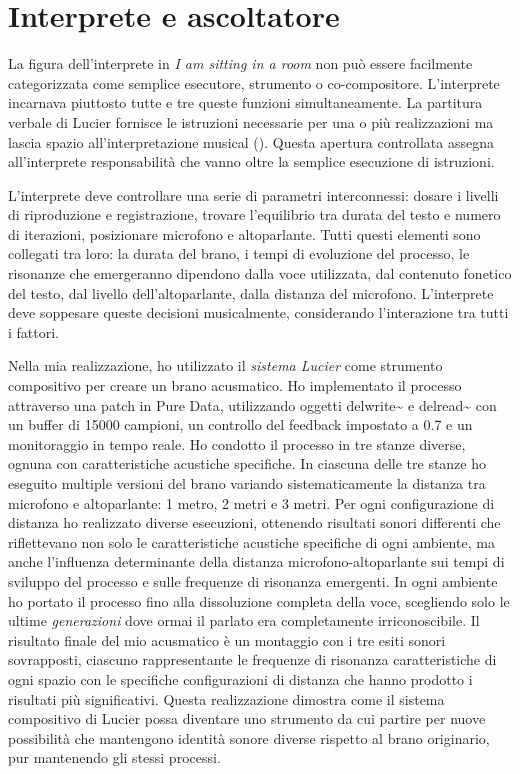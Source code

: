 
\section{Interprete e ascoltatore}
La figura dell'interprete in \textit{I am sitting in a room} non può essere facilmente categorizzata come semplice esecutore, strumento o co-compositore. L'interprete incarnava piuttosto tutte e tre queste funzioni simultaneamente. La partitura verbale di Lucier fornisce le istruzioni necessarie per una o più realizzazioni ma lascia spazio all'interpretazione musical (\cite{Lucier1995}). Questa apertura controllata assegna all'interprete responsabilità che vanno oltre la semplice esecuzione di istruzioni.

L'interprete deve controllare una serie di parametri interconnessi: dosare i livelli di riproduzione e registrazione, trovare l'equilibrio tra durata del testo e numero di iterazioni, posizionare microfono e altoparlante. Tutti questi elementi sono collegati tra loro: la durata del brano, i tempi di evoluzione del processo, le risonanze che emergeranno dipendono dalla voce utilizzata, dal contenuto fonetico del testo, dal livello dell'altoparlante, dalla distanza del microfono. L'interprete deve soppesare queste decisioni musicalmente, considerando l'interazione tra tutti i fattori.

Nella mia realizzazione, ho utilizzato il \textit{sistema Lucier} come strumento compositivo per creare un brano acusmatico. Ho implementato il processo attraverso una patch in Pure Data, utilizzando oggetti delwrite\textasciitilde{} e delread\textasciitilde{} con un buffer di 15000 campioni, un controllo del feedback impostato a 0.7 e un monitoraggio in tempo reale. Ho condotto il processo in tre stanze diverse, ognuna con caratteristiche acustiche specifiche. In ciascuna delle tre stanze ho eseguito multiple versioni del brano variando sistematicamente la distanza tra microfono e altoparlante: 1 metro, 2 metri e 3 metri. Per ogni configurazione di distanza ho realizzato diverse esecuzioni, ottenendo risultati sonori differenti che riflettevano non solo le caratteristiche acustiche specifiche di ogni ambiente, ma anche l'influenza determinante della distanza microfono-altoparlante sui tempi di sviluppo del processo e sulle frequenze di risonanza emergenti. In ogni ambiente ho portato il processo fino alla dissoluzione completa della voce, scegliendo solo le ultime \textit{generazioni} dove ormai il parlato era completamente irriconoscibile. Il risultato finale del mio acusmatico è un montaggio con i tre esiti sonori sovrapposti, ciascuno rappresentante le frequenze di risonanza caratteristiche di ogni spazio con le specifiche configurazioni di distanza che hanno prodotto i risultati più significativi. Questa realizzazione dimostra come il sistema compositivo di Lucier possa diventare uno strumento da cui partire per nuove possibilità che mantengono identità sonore diverse rispetto al brano originario, pur mantenendo gli stessi processi.

